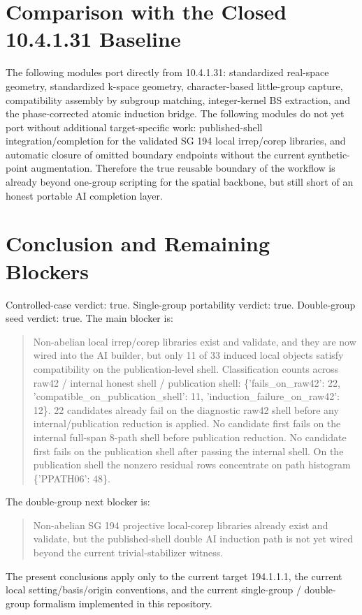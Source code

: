 \documentclass[11pt]{article}
\begin{document}
\section{Comparison with the Closed 10.4.1.31 Baseline}
The following modules port directly from 10.4.1.31: standardized real-space geometry, standardized k-space geometry, character-based little-group capture, compatibility assembly by subgroup matching, integer-kernel BS extraction, and the phase-corrected atomic induction bridge. The following modules do not yet port without additional target-specific work: published-shell integration/completion for the validated SG 194 local irrep/corep libraries, and automatic closure of omitted boundary endpoints without the current synthetic-point augmentation. Therefore the true reusable boundary of the workflow is already beyond one-group scripting for the spatial backbone, but still short of an honest portable AI completion layer.

\section{Conclusion and Remaining Blockers}
Controlled-case verdict: true. Single-group portability verdict: true. Double-group seed verdict: true. The main blocker is:
\begin{quote}
Non-abelian local irrep/corep libraries exist and validate, and they are now wired into the AI builder, but only 11 of 33 induced local objects satisfy compatibility on the publication-level shell. Classification counts across raw42 / internal honest shell / publication shell: \{'fails\_on\_raw42': 22, 'compatible\_on\_publication\_shell': 11, 'induction\_failure\_on\_raw42': 12\}. 22 candidates already fail on the diagnostic raw42 shell before any internal/publication reduction is applied. No candidate first fails on the internal full-span 8-path shell before publication reduction. No candidate first fails on the publication shell after passing the internal shell. On the publication shell the nonzero residual rows concentrate on path histogram \{'PPATH06': 48\}.
\end{quote}
The double-group next blocker is:
\begin{quote}
Non-abelian SG 194 projective local-corep libraries already exist and validate, but the published-shell double AI induction path is not yet wired beyond the current trivial-stabilizer witness.
\end{quote}
The present conclusions apply only to the current target 194.1.1.1, the current local setting/basis/origin conventions, and the current single-group / double-group formalism implemented in this repository.
\end{document}
